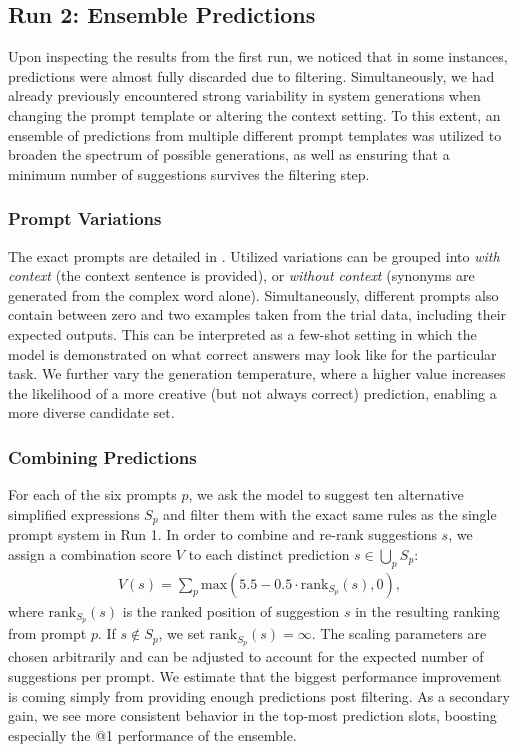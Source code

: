 \documentclass[11pt]{article}
\begin{document}
\subsection{Run 2: Ensemble Predictions}
Upon inspecting the results from the first run, we noticed that in some instances, predictions were almost fully discarded due to filtering.
Simultaneously, we had already previously encountered strong variability in system generations when changing the prompt template or altering the context setting.
To this extent, an ensemble of predictions from multiple different prompt templates was utilized to broaden the spectrum of possible generations, as well as ensuring that a minimum number of suggestions survives the filtering step.

\subsubsection{Prompt Variations}

The exact prompts are detailed in .
Utilized variations can be grouped into \emph{with context} (the context sentence is provided), or \emph{without context} (synonyms are generated from the complex word alone).
Simultaneously, different prompts also contain between zero and two examples taken from the trial data, including their expected outputs. This can be interpreted as a few-shot setting in which the model is demonstrated on what correct answers may look like for the particular task.
We further vary the generation temperature, where a higher value increases the likelihood of a more creative (but not always correct) prediction, enabling a more diverse candidate set.

\subsubsection{Combining Predictions}

For each of the six prompts $p$, we ask the model to suggest ten alternative simplified expressions $S_p$ and filter them with the exact same rules as the single prompt system in Run 1. In order to combine and re-rank suggestions $s$, we assign a combination score $V$ to each distinct prediction $s \in \bigcup_p S_p$:
\begin{align}
	V(s) = \sum_p \text{max}(5.5 - 0.5 \cdot \text{rank}_{S_p}(s), 0),
\end{align}
where $\text{rank}_{S_p}(s)$ is the ranked position of suggestion $s$ in the resulting ranking from prompt $p$. If $s \notin S_p$, we set $\text{rank}_{S_p}(s) = \infty$. The scaling parameters are chosen arbitrarily and can be adjusted to account for the expected number of suggestions per prompt.
We estimate that the biggest performance improvement is coming simply from providing enough predictions post filtering.
As a secondary gain, we see more consistent behavior in the top-most prediction slots, boosting especially the @1 performance of the ensemble.
\end{document}
